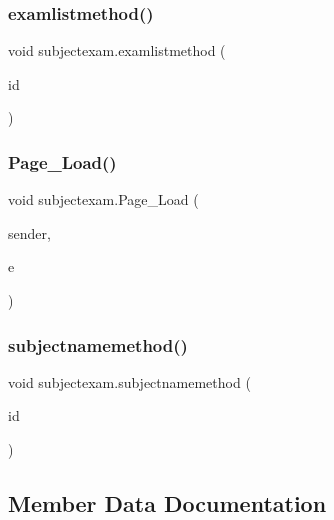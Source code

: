 \subsubsection{\texorpdfstring{examlistmethod()}{examlistmethod()}}
{\footnotesize\ttfamily void subjectexam.\+examlistmethod (\begin{DoxyParamCaption}\item[{int}]{id }\end{DoxyParamCaption})}

\mbox{\label{classsubjectexam_aad45233acf953fa73d517c5afe62903f}} 
\subsubsection{\texorpdfstring{Page\_Load()}{Page\_Load()}}
{\footnotesize\ttfamily void subjectexam.\+Page\+\_\+\+Load (\begin{DoxyParamCaption}\item[{object}]{sender,  }\item[{Event\+Args}]{e }\end{DoxyParamCaption})\hspace{0.3cm}{\ttfamily [protected]}}

\mbox{\label{classsubjectexam_a702c75b4ff95fdf12d5b11ad0cfaf62b}} 
\subsubsection{\texorpdfstring{subjectnamemethod()}{subjectnamemethod()}}
{\footnotesize\ttfamily void subjectexam.\+subjectnamemethod (\begin{DoxyParamCaption}\item[{int}]{id }\end{DoxyParamCaption})}



\subsection{Member Data Documentation}
\mbox{\label{classsubjectexam_a8387fc4c835e97171deccb08e1404887}} 
